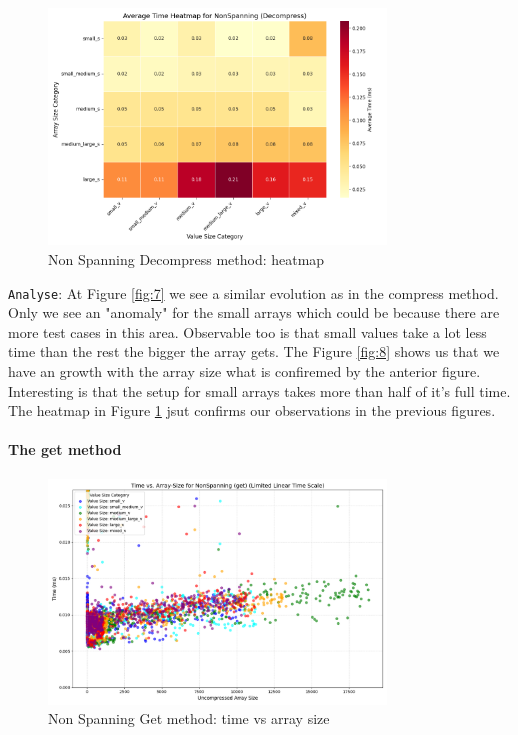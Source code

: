 \documentclass[11pt, a4paper]{article}
\begin{document}
	\begin{figure}[H]%
		\centering
		\includegraphics[width=0.8\textwidth]{Grafics/NonSpanning/NonSpanningDecompressHeat.png}
		\caption{Non Spanning Decompress method: heatmap}
		\label{fig:9}
	\end{figure}
	\texttt{Analyse}: At Figure \ref{fig:7} we see a similar evolution as in the compress method. Only we see an "anomaly" for the small arrays which could be because there are more test cases in this area. Observable too is that small values take a lot less time than the rest the bigger the array gets. 
	The Figure \ref{fig:8} shows us that we have an growth with the array size what is confiremed by the anterior figure. Interesting is that the setup for small arrays takes more than half of it's full time.
	The heatmap in Figure \ref{fig:9} jsut confirms our observations in the previous figures.
	  
	\paragraph{The get method}
	\begin{figure}[H]%
		\centering
		\includegraphics[width=0.8\textwidth]{Grafics/NonSpanning/NonSpanningGetTimevsSize.png}
		\caption{Non Spanning Get method: time vs array size}
		\label{fig:10}
		
	\end{figure}
	
\end{document}
